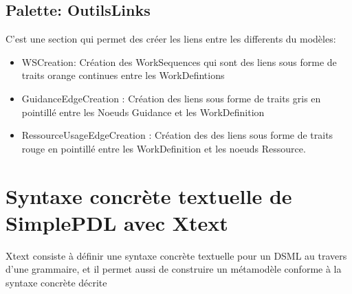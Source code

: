 \documentclass{article}
\begin{document}
\subsection{Palette: OutilsLinks}

C'est une section qui permet des créer les liens entre les differents  du modèles:

\begin{itemize}
\item WSCreation: Création des WorkSequences qui sont des liens sous forme de traits orange continues  entre les WorkDefintions
\item GuidanceEdgeCreation : Création des liens sous forme de traits gris en pointillé entre les Noeuds Guidance et les WorkDefinition
\item RessourceUsageEdgeCreation : Création des des liens sous forme de traits rouge en pointillé entre les WorkDefinition et les noeuds Ressource.

\end{itemize}


\section{Syntaxe concrète textuelle de SimplePDL avec Xtext}
Xtext consiste à définir une syntaxe concrète textuelle pour un DSML au travers d’une grammaire, et il permet aussi 
de construire un métamodèle conforme à la syntaxe concrète décrite 
\end{document}
